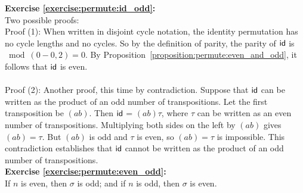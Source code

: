 \noindent\textbf{Exercise  \ref{exercise:permute:id_odd}:}\\
Two possible proofs:
\\
Proof (1): When written in disjoint cycle notation, the identity permutation has no cycle lengths and no cycles.  So by the definition of parity, the parity of  $\sf{id}$ is $\bmod(0-0,2) = 0$.  By Proposition~\ref{proposition:permute:even_and_odd}, it follows that $\sf{id}$ is even.\\
\\
Proof (2): Another proof, this time by contradiction.  Suppose that $\sf{id}$ can be written as the product of an odd number of transpositions.  Let the first transposition be $(ab)$.  Then $\sf{id}$ = $(ab)\tau$, where $\tau$ can be written as an even number of transpositions.  Multiplying both sides on the left by $(ab)$ gives $(ab) = \tau$.  But $(ab)$ is odd and $\tau$ is even, so $(ab)=\tau$ is impossible. This contradiction establishes that $\sf{id}$ cannot be written as the product of an odd number of transpositions.\\


\noindent\textbf{Exercise  \ref{exercise:permute:even_odd}:}\\
If $n$ is even, then $\sigma$ is odd; and if $n$ is odd, then $\sigma$ is even.\\

